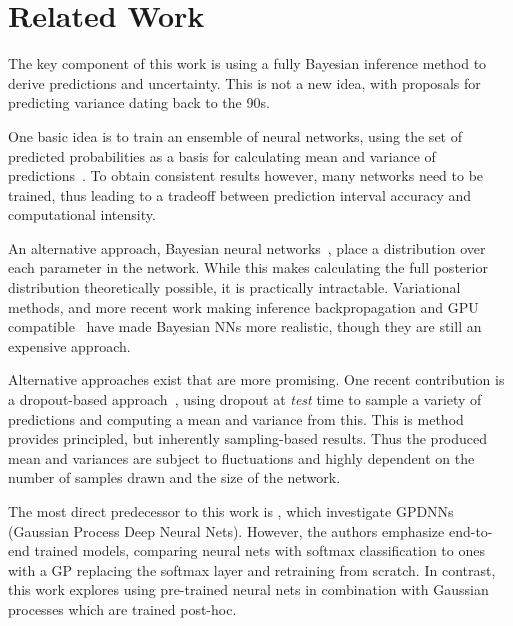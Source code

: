\documentclass{article}
\begin{document}
 



\section{Related Work}


The key component of this work is using a fully Bayesian inference method to derive predictions and uncertainty. This is not a new idea, with proposals for predicting variance dating back to the 90s.

One basic idea is to train an ensemble of neural networks, using the set of predicted probabilities as a basis for calculating mean and variance of predictions~\cite{paass1993assessing}. To obtain consistent results however, many networks need to be trained, thus leading to a tradeoff between prediction interval accuracy and computational intensity.

An alternative approach, Bayesian neural networks~\cite{mackay1992practical}, place a distribution over each parameter in the network. While this makes calculating the full posterior distribution theoretically possible, it is practically intractable. Variational methods, and more recent work making inference backpropagation and GPU compatible~\cite{blundell2015weight} have made Bayesian NNs more realistic, though they are still an expensive approach. 

Alternative approaches exist that are more promising. One recent contribution is a dropout-based approach~\cite{gal2016dropout}, using dropout at \textit{test} time to sample a variety of predictions and computing a mean and variance from this. This is method provides principled, but  inherently sampling-based results. Thus the produced mean and variances are subject to fluctuations and highly dependent on the number of samples drawn and the size of the network.

The most direct predecessor to this work is \citet{Bradshaw2017}, which investigate GPDNNs (Gaussian Process Deep Neural Nets). However, the authors emphasize end-to-end trained models, comparing neural nets with softmax classification to ones with a GP replacing the softmax layer and retraining from scratch. In contrast, this work explores using pre-trained neural nets in combination with Gaussian processes which are trained post-hoc. 
\end{document}
